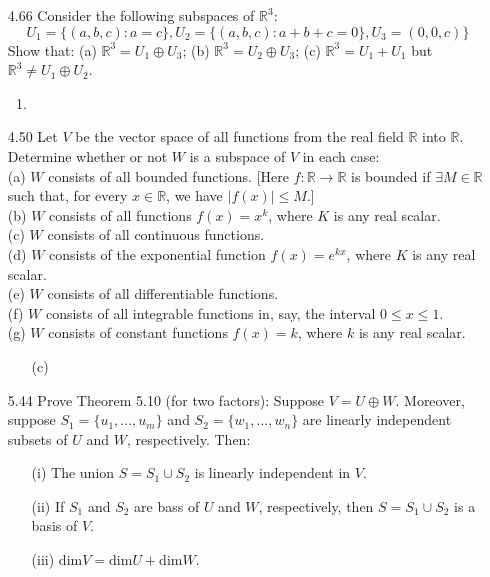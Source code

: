 \documentclass[12pt]{article}
\theoremstyle{definition}
\theoremstyle{plain}
\begin{document}
\begin{enumerate}
	\begin{enumerate}
	\item
	\end{enumerate}
\item[4.66]Consider the following subspaces of $\mathbb{R}^3$:
\[ U_1=\{(a,b,c): a=c\},U_2=\{(a,b,c): a+b+c=0\}, U_3=(0,0,c)\} \]
Show that: (a) $\mathbb{R}^3=U_1\oplus U_3$; (b) $\mathbb{R}^3=U_2\oplus U_3$; (c) $\mathbb{R}^3=U_1+U_1$ but $\mathbb{R}^3\neq U_1\oplus U_2$.
	\begin{enumerate}
	\item
	\end{enumerate}
\item[4.50]Let $V$ be the vector space of all functions from the real field $\mathbb{R}$ into $\mathbb{R}$. Determine whether or not $W$ is a subspace of $V$ in each case:\\
(a) $W$ consists of all bounded functions. [Here $f: \mathbb{R}\rightarrow\mathbb{R}$ is bounded if $\exists M \in \mathbb{R}$ such that, for every $x\in \mathbb{R}$, we have $|f(x)| \leq M$.]\\
(b) $W$ consists of all functions $f(x)=x^k$, where $K$ is any real scalar.\\
(c) $W$ consists of all continuous functions.\\
(d) $W$ consists of the exponential function $f(x)=e^{kx}$, where $K$ is any real scalar.\\
(e) $W$ consists of all differentiable functions.\\
(f) $W$ consists of all integrable functions in, say, the interval $0\leq x \leq 1$.\\
(g) $W$ consists of constant functions $f(x)=k$, where $k$ is any real scalar.
	\begin{enumerate}
	\item[(c)]
	\end{enumerate}
\item[5.44]Prove Theorem 5.10 (for two factors): Suppose $V=U\oplus W$. Moreover, suppose $S_1=\{u_1,...,u_m\}$ and $S_2=\{w_1,...,w_n\}$ are linearly independent subsets of $U$ and $W$, respectively. Then:
	\begin{enumerate}
	\item[(i)] The union $S=S_1 \cup S_2$ is linearly independent in $V$.
	\item[(ii)] If $S_1$ and $S_2$ are bass of $U$ and $W$, respectively, then $S=S_1 \cup S_2$ is a basis of $V$.
	\item[(iii)] $\mathrm{dim}V = \mathrm{dim}U + \mathrm{dim}W$.

\end{enumerate}
\end{enumerate}
\end{document}
